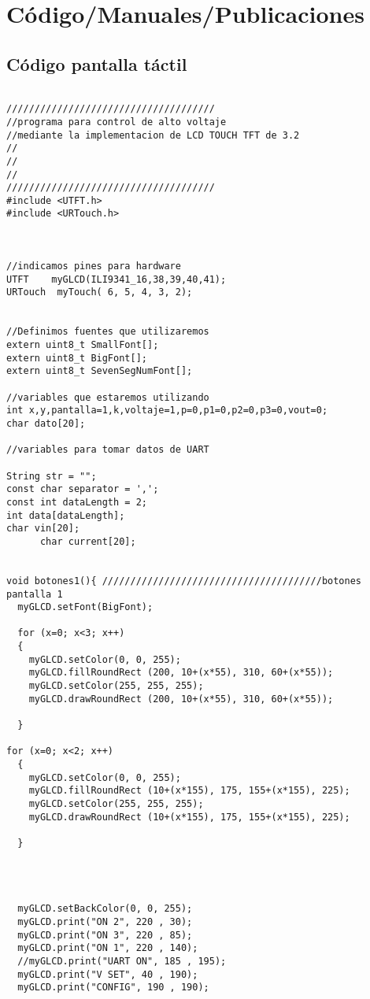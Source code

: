 \chapter{Código/Manuales/Publicaciones}
\section{Código pantalla táctil}
\begin{verbatim}

/////////////////////////////////////
//programa para control de alto voltaje
//mediante la implementacion de LCD TOUCH TFT de 3.2
//
//
//
/////////////////////////////////////
#include <UTFT.h>
#include <URTouch.h>



//indicamos pines para hardware
UTFT    myGLCD(ILI9341_16,38,39,40,41);
URTouch  myTouch( 6, 5, 4, 3, 2);


//Definimos fuentes que utilizaremos
extern uint8_t SmallFont[];
extern uint8_t BigFont[];
extern uint8_t SevenSegNumFont[];

//variables que estaremos utilizando
int x,y,pantalla=1,k,voltaje=1,p=0,p1=0,p2=0,p3=0,vout=0;
char dato[20];

//variables para tomar datos de UART

String str = "";
const char separator = ',';
const int dataLength = 2;
int data[dataLength];
char vin[20];
      char current[20];


void botones1(){ ///////////////////////////////////////botones pantalla 1
  myGLCD.setFont(BigFont); 

  for (x=0; x<3; x++)
  {
    myGLCD.setColor(0, 0, 255);
    myGLCD.fillRoundRect (200, 10+(x*55), 310, 60+(x*55));
    myGLCD.setColor(255, 255, 255);
    myGLCD.drawRoundRect (200, 10+(x*55), 310, 60+(x*55));
    
  }

for (x=0; x<2; x++)
  {
    myGLCD.setColor(0, 0, 255);
    myGLCD.fillRoundRect (10+(x*155), 175, 155+(x*155), 225);
    myGLCD.setColor(255, 255, 255);
    myGLCD.drawRoundRect (10+(x*155), 175, 155+(x*155), 225);
    
  }



  
  myGLCD.setBackColor(0, 0, 255);
  myGLCD.print("ON 2", 220 , 30);
  myGLCD.print("ON 3", 220 , 85);
  myGLCD.print("ON 1", 220 , 140);
  //myGLCD.print("UART ON", 185 , 195);
  myGLCD.print("V SET", 40 , 190);
  myGLCD.print("CONFIG", 190 , 190);
  

\end{verbatim}
